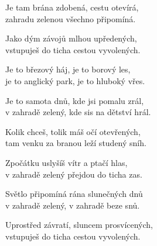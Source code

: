 
\ve{}
Je tam brána zdobená, cestu otevírá,\\
zahradu zelenou všechno připomíná.

\ve{}
Jako dým závojů mlhou upředených,\\
vstupuješ do ticha cestou vyvolených.

\ve{}
Je to březový háj, je to borový les,\\
je to anglický park, je to hluboký vřes.

\ve{}
Je to samota dnů, kde jsi pomalu zrál,\\
v zahradě zelený, kde sis na dětství hrál.

\ve{}
Kolik chceš, tolik máš očí otevřených,\\
tam venku za branou leží studený sníh.

\ve{}
Zpočátku uslyšíš vítr a ptačí hlas,\\
v zahradě zelený přejdou do ticha zas.

\ve{}
Světlo připomíná rána slunečných dnů\\
v zahradě zelený, v zahradě beze snů.

\ve{}
Uprostřed závratí, sluncem prosvícených,\\
vstupuješ do ticha cestou vyvolených.

\esong{}
